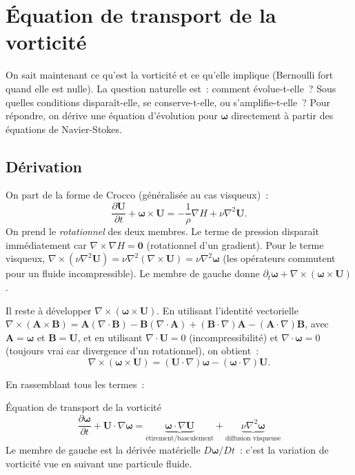 \documentclass[11pt,a4paper]{report}
\newcommand{\pd}[2]{\dfrac{\partial #1}{\partial #2}}
\begin{document}
\section{\'Equation de transport de la vorticit\'e}

On sait maintenant ce qu'est la vorticit\'e et ce qu'elle implique (Bernoulli fort quand
elle est nulle). La question naturelle est~: comment \'evolue-t-elle~? Sous quelles conditions
dispara\^it-elle, se conserve-t-elle, ou s'amplifie-t-elle~? Pour r\'epondre, on d\'erive
une \'equation d'\'evolution pour $\boldsymbol{\omega}$ directement \`a partir des \'equations
de Navier-Stokes.

\subsection{D\'erivation}

On part de la forme de Crocco (g\'en\'eralis\'ee au cas visqueux)~:
\[
  \pd{\bm{U}}{t} + \boldsymbol{\omega}\times\bm{U}
  = -\frac{1}{\rho}\nabla H + \nu\nabla^2\bm{U}.
\]
On prend le \emph{rotationnel} des deux membres. Le terme de pression dispara\^it
imm\'ediatement car $\nabla\times\nabla H = \bm{0}$ (rotationnel d'un gradient). Pour le
terme visqueux, $\nabla\times(\nu\nabla^2\bm{U}) = \nu\nabla^2(\nabla\times\bm{U})
= \nu\nabla^2\boldsymbol{\omega}$ (les op\'erateurs commutent pour un fluide incompressible).
Le membre de gauche donne $\partial_t\boldsymbol{\omega}
+ \nabla\times(\boldsymbol{\omega}\times\bm{U})$.

Il reste \`a d\'evelopper $\nabla\times(\boldsymbol{\omega}\times\bm{U})$. En utilisant
l'identit\'e vectorielle
$\nabla\times(\bm{A}\times\bm{B}) = \bm{A}(\nabla\cdot\bm{B})
- \bm{B}(\nabla\cdot\bm{A}) + (\bm{B}\cdot\nabla)\bm{A} - (\bm{A}\cdot\nabla)\bm{B}$,
avec $\bm{A}=\boldsymbol{\omega}$ et $\bm{B}=\bm{U}$, et en utilisant
$\nabla\cdot\bm{U}=0$ (incompressibilit\'e) et $\nabla\cdot\boldsymbol{\omega}=0$
(toujours vrai car divergence d'un rotationnel), on obtient~:
\[
  \nabla\times(\boldsymbol{\omega}\times\bm{U})
  = (\bm{U}\cdot\nabla)\boldsymbol{\omega} - (\boldsymbol{\omega}\cdot\nabla)\bm{U}.
\]

En rassemblant tous les termes~:

\begin{importantbox}{\'Equation de transport de la vorticit\'e}
\[
  \pd{\boldsymbol{\omega}}{t} + \bm{U}\cdot\nabla\boldsymbol{\omega}
  = \underbrace{\boldsymbol{\omega}\cdot\nabla\bm{U}}_{\text{\'etirement/basculement}}
  + \underbrace{\nu\nabla^2\boldsymbol{\omega}}_{\text{diffusion visqueuse}}
\]
Le membre de gauche est la d\'eriv\'ee mat\'erielle $D\boldsymbol{\omega}/Dt$~: c'est la
variation de vorticit\'e vue en suivant une particule fluide.
\end{importantbox}
\end{document}

